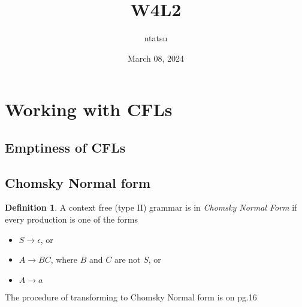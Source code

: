 \documentclass{article}
\title{W4L2}
\author{ntatsu}
\date{March 08, 2024}
\theoremstyle{definition}
\newtheorem{definition}{Definition}[section]
\theoremstyle{remark}
\begin{document}
\maketitle

\section{Working with CFLs}

\subsection*{Emptiness of CFLs}
\iffalse
\begin{algorithmic}
    \text{input: A CFG with state} 
\end{algorithmic}
\fi

\subsection*{Chomsky Normal form}
\begin{definition}
    A context free (type II) grammar is in \textit{Chomsky Normal Form} if every production is one of the forms
    \begin{itemize}
        \item $S \rightarrow \epsilon$, or
        \item $A \rightarrow BC$, where $B$ and $C$ are not $S$, or
        \item $A \rightarrow a$
    \end{itemize}
        

\end{definition}

The procedure of transforming to Chomsky Normal form is on pg.16
\end{document}
